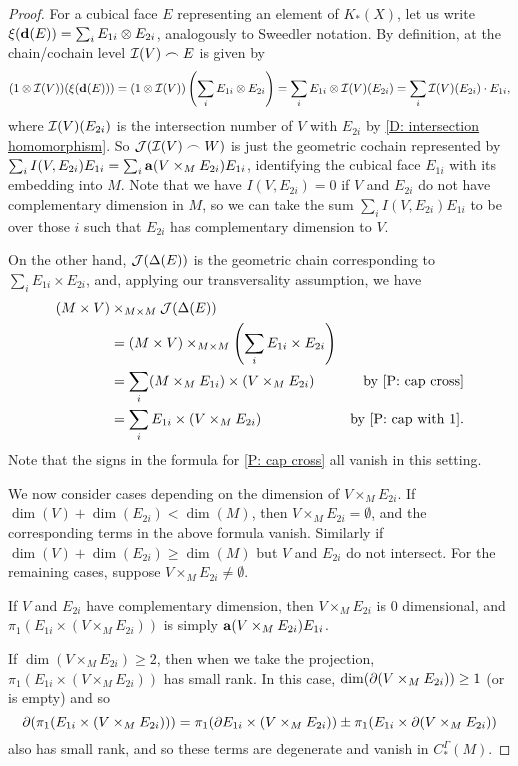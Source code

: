 \begin{proof}
	For a cubical face $E$ representing an element of $K_*(X)$, let us write $\xi(\mathbf{d} (E)) = \sum_i E_{1i} \otimes E_{2i}$, analogously to Sweedler notation.
	By definition, at the chain/cochain level $\mathcal{I}(V)\frown E$ is given by
	$$(1 \otimes \mathcal{I}(V))(\xi(\mathbf{d} (E))) = (1 \otimes \mathcal{I}(V))\left(\sum_i E_{1i} \otimes E_{2i}\right) = \sum_i E_{1i} \otimes \mathcal{I}(V)(E_{2i}) = \sum_i \mathcal{I}(V)(E_{2i})\cdot E_{1i},$$
	where $\mathcal{I}(V)(E_{2i})$ is the intersection number of $V$ with $E_{2i}$ by \cref{D: intersection homomorphism}.
	So $\mathcal{J}(\mathcal{I}(V)\frown W)$ is just the geometric cochain represented by $\sum_i I(V,E_{2i})E_{1i} = \sum_i \mathbf{a}(V \times_M E_{2i})E_{1i} $, identifying the cubical face $E_{1i}$ with its embedding into $M$.
	Note that we have $I(V,E_{2i}) = 0$ if $V$ and $E_{2i}$ do not have complementary dimension in $M$, so we can take the sum $\sum_i I(V,E_{2i})E_{1i}$ to be over those $i$ such that $E_{2i}$ has complementary dimension to $V$.

	On the other hand, $\mathcal{J}(\Delta(E))$ is the geometric chain corresponding to $\sum_i E_{1i} \times E_{2i}$, and, applying our transversality assumption, we have
	\begin{align*}
		(M \times V)&\times_{M \times M}\mc J(\Delta(E))\\
		& = (M \times V)\times_{M \times M}\left(\sum_i E_{1i} \times E_{2i}\right)\\
		& = \sum_i (M \times_M E_{1i}) \times (V \times_M E_{2i})&\text{by \cref{P: cap cross}}\\
		& = \sum_i E_{1i} \times (V \times_M E_{2i})&\text{by \cref{P: cap with 1}}.
	\end{align*}
	Note that the signs in the formula for \cref{P: cap cross} all vanish in this setting.

	We now consider cases depending on the dimension of $V \times_M E_{2i}$.
	If $\dim(V)+\dim(E_{2i})<\dim (M)$, then $V \times_M E_{2i} = \emptyset$, and the corresponding terms in the above formula vanish.
	Similarly if $\dim(V)+\dim(E_{2i})\geq \dim (M)$ but $V$ and $E_{2i}$ do not intersect.
	For the remaining cases, suppose
	$V \times_M E_{2i}\neq \emptyset$.

	If $V$ and $E_{2i}$ have complementary dimension, then $V \times_M E_{2i}$ is $0$ dimensional, and $\pi_1(
	E_{1i} \times (V \times_M E_{2i}))$ is simply $\mathbf{a}(V \times_M E_{2i})E_{1i}$.

	If $\dim(V \times_M E_{2i})\geq 2$, then when we take the projection,
	$\pi_1(E_{1i} \times (V \times_M E_{2i}))$ has small rank.
	In this case, $\dim(\partial (V \times_M E_{2i}))\geq 1$ (or is empty) and so
	$$\partial(\pi_1(E_{1i} \times (V \times_M E_{2i}))) = \pi_1(\partial E_{1i} \times (V \times_M E_{2i}))\pm \pi_1(E_{1i} \times \partial(V \times_M E_{2i}))$$
	also has small rank, and so these terms are degenerate and vanish in $C^\Gamma_*(M)$.


\end{proof}
